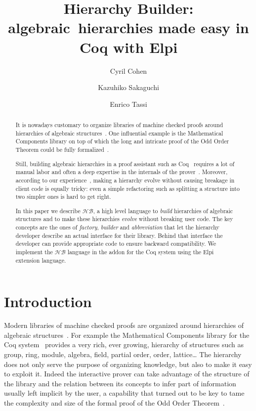 \documentclass[a4paper,UKenglish,cleveref, autoref]{lipics-v2019}
\title{Hierarchy Builder: algebraic~hierarchies made easy in Coq with Elpi} %
\author{Cyril Cohen}{Inria, Universit\'e C\^ote d'Azur, France}{Cyril.Cohen@inria.fr}{}{}
\author{Kazuhiko Sakaguchi}{University of Tsukuba, Japan}{sakaguchi@logic.cs.tsukuba.ac.jp}{}{}
\author{Enrico Tassi}{Inria, Universit\'e C\^ote d'Azur, France}{Enrico.Tassi@inria.fr}{}{}
\newcommand{\HB}{\ensuremath{\mathcal{HB}}}
\newcommand{\hb}{\coq{hierarchy-builder}}
\newcommand{\factory}{factory}
\newcommand{\phantterm}{abbreviation}
\newcommand{\mixinbuilder}{builder}
\theoremstyle{implem}
\theoremstyle{implem}
\theoremstyle{command}
\theoremstyle{commands}
\begin{document}
\maketitle

\begin{abstract}
It is nowadays customary to organize libraries of machine checked
proofs around hierarchies of algebraic
structures~\cite{DBLP:conf/mpc/AffeldtNS19,DBLP:journals/mics/BoldoLM15,Cohen_phd,Holzl:2013,10.1145/3372885.3373824,Rouhling_phd,mathclasses}.
One influential example is the Mathematical Components library on top
of which the long and intricate proof of the Odd Order
Theorem could be fully formalized~\cite{DBLP:conf/itp/GonthierAABCGRMOBPRSTT13}.

Still, building algebraic hierarchies in a proof assistant such as Coq~\cite{Coq:manual}
requires a lot of manual labor and often a deep expertise in the internals of
the prover~\cite{DBLP:conf/tphol/GarillotGMR09,DBLP:conf/itp/MahboubiT13}.
Moreover, according to our experience~\cite{KSdraft},
making a hierarchy evolve without causing breakage in client code is equally tricky:
even a simple refactoring such as splitting a structure into two simpler ones
is hard to get right.

In this paper we describe \HB{}, a high level language
to \emph{build} hierarchies of algebraic structures and to make these hierarchies
\emph{evolve} without breaking user code. The key concepts are the ones of
\emph{\factory{}}, \emph{\mixinbuilder{}} and \emph{\phantterm{}} that let the hierarchy developer
describe an actual
interface for their library. Behind that interface the developer can provide
appropriate code to ensure backward compatibility.
We implement the \HB{} language in the \hb{} addon for the Coq
system using the Elpi~\cite{DBLP:conf/lpar/DunchevGCT15,CoqElpi}
extension language.
\end{abstract}

\section{Introduction}

Modern libraries of machine checked proofs are organized around
hierarchies of algebraic structures~\cite{DBLP:conf/mpc/AffeldtNS19,DBLP:journals/mics/BoldoLM15,Cohen_phd,Holzl:2013,10.1145/3372885.3373824,Rouhling_phd,mathclasses}.
For example the Mathematical Components library for the Coq system~\cite{Coq:manual}
provides a very rich, ever growing, hierarchy of structures such as
group, ring, module, algebra, field, partial order, order, lattice\ldots
The hierarchy does not only serve the purpose of organizing knowledge, but
also to make it easy to exploit it. Indeed the interactive prover can
take advantage of the structure of the library and the relation between
its concepts to infer part of information usually left implicit
by the user, a capability that turned out to be key to tame
the complexity and size of the formal proof of the Odd Order
Theorem~\cite{DBLP:conf/itp/GonthierAABCGRMOBPRSTT13}.
\end{document}
